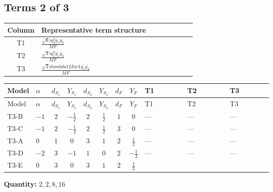 \documentclass[8pt]{article}
\begin{document}
\begin{landscape}
\subsection*{Terms 2 of 3}
\begin{center}
\begin{tabular}{@{}c >{\raggedright\arraybackslash}p{0.82\linewidth}@{}}
\toprule
Column & Representative term structure \\
\midrule
T1 & \(\displaystyle \frac{\sqrt{6} i g_{2}^{2} \overline{y_{1}} \overline{y_{2}}}{MF}\) \\
\midrule
T2 & \(\displaystyle \frac{\sqrt{3} i g_{1}^{2} \overline{y_{1}} \overline{y_{2}}}{MF}\) \\
\midrule
T3 & \(\displaystyle \frac{\sqrt{3} i lambda12Inv1 \overline{y_{1}} \overline{y_{2}}}{MF}\) \\
\midrule
\bottomrule
\end{tabular}
\end{center}
\smallskip
\tiny
\begin{longtable}{@{}llcccccc >{\raggedright\arraybackslash}p{0.21\linewidth} >{\raggedright\arraybackslash}p{0.21\linewidth} >{\raggedright\arraybackslash}p{0.21\linewidth}@{}}
\toprule
Model & $\alpha$ & $d_{S_1}$ & $Y_{S_1}$ & $d_{S_2}$ & $Y_{S_2}$ & $d_F$ & $Y_F$ & T1 & T2 & T3 \\
\midrule
\endfirsthead
\toprule
Model & $\alpha$ & $d_{S_1}$ & $Y_{S_1}$ & $d_{S_2}$ & $Y_{S_2}$ & $d_F$ & $Y_F$ & T1 & T2 & T3 \\
\midrule
\endhead
T3-B & $-1$ & $2$ & $-\frac{1}{2}$ & $2$ & $\frac{1}{2}$ & $1$ & $0$ & --- & --- & --- \\
\midrule
T3-C & $-1$ & $2$ & $-\frac{1}{2}$ & $2$ & $\frac{1}{2}$ & $3$ & $0$ & --- & --- & --- \\
\midrule
T3-A & $0$ & $1$ & $0$ & $3$ & $1$ & $2$ & $\frac{1}{2}$ & --- & --- & --- \\
\midrule
T3-D & $-2$ & $3$ & $-1$ & $1$ & $0$ & $2$ & $-\frac{1}{2}$ & --- & --- & --- \\
\midrule
T3-E & $0$ & $3$ & $0$ & $3$ & $1$ & $2$ & $\frac{1}{2}$ & \scriptsize\adjustbox{max width=\linewidth}{$\begin{gathered} - \frac{\sqrt{6} i g_{2}^{2} \overline{y_{1}} \overline{y_{2}}}{3 MF}\end{gathered}$} & \scriptsize\adjustbox{max width=\linewidth}{$\begin{gathered} - \frac{\sqrt{3} i g_{1}^{2} \overline{y_{1}} \overline{y_{2}}}{8 MF}\end{gathered}$} & \scriptsize\adjustbox{max width=\linewidth}{$\begin{gathered} \frac{\sqrt{3} i lambda12Inv1 \overline{y_{1}} \overline{y_{2}}}{6 MF}\end{gathered}$} \\
\midrule
\bottomrule
\end{longtable}
\clearpage
\noindent\textbf{Quantity: }$\mathrm{2,2,8,16}$\par\smallskip

\end{landscape}
\end{document}
